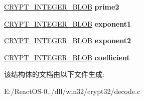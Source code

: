 \begin{DoxyCompactItemize}
\hyperlink{struct___c_r_y_p_t_o_a_p_i___b_l_o_b}{C\+R\+Y\+P\+T\+\_\+\+I\+N\+T\+E\+G\+E\+R\+\_\+\+B\+L\+OB} {\bfseries prime2}
\item 
\mbox{\label{struct_d_e_c_o_d_e_d___r_s_a___p_r_i_v___k_e_y_a31a277b1ec14c70874182d3f6505da8a}} 
\hyperlink{struct___c_r_y_p_t_o_a_p_i___b_l_o_b}{C\+R\+Y\+P\+T\+\_\+\+I\+N\+T\+E\+G\+E\+R\+\_\+\+B\+L\+OB} {\bfseries exponent1}
\item 
\mbox{\label{struct_d_e_c_o_d_e_d___r_s_a___p_r_i_v___k_e_y_af55d67aebdfb6145133c35701ff0723e}} 
\hyperlink{struct___c_r_y_p_t_o_a_p_i___b_l_o_b}{C\+R\+Y\+P\+T\+\_\+\+I\+N\+T\+E\+G\+E\+R\+\_\+\+B\+L\+OB} {\bfseries exponent2}
\item 
\mbox{\label{struct_d_e_c_o_d_e_d___r_s_a___p_r_i_v___k_e_y_a41c70abc5e0d84daad1abae0cd28aa50}} 
\hyperlink{struct___c_r_y_p_t_o_a_p_i___b_l_o_b}{C\+R\+Y\+P\+T\+\_\+\+I\+N\+T\+E\+G\+E\+R\+\_\+\+B\+L\+OB} {\bfseries coefficient}
\end{DoxyCompactItemize}


该结构体的文档由以下文件生成\+:\begin{DoxyCompactItemize}
\item 
E\+:/\+React\+O\+S-\/0../dll/win32/crypt32/decode.\+c\end{DoxyCompactItemize}
